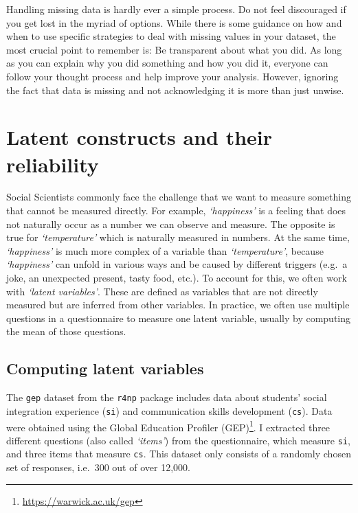 \documentclass[
  letterpaper,
]{krantz}
\renewcommand{\href}[2]{#2\footnote{\url{#1}}}
\begin{document}
Handling missing data is hardly ever a simple process. Do not feel
discouraged if you get lost in the myriad of options. While there is
some guidance on how and when to use specific strategies to deal with
missing values in your dataset, the most crucial point to remember is:
Be transparent about what you did. As long as you can explain why you
did something and how you did it, everyone can follow your thought
process and help improve your analysis. However, ignoring the fact that
data is missing and not acknowledging it is more than just unwise.

\section{Latent constructs and their
reliability}\label{sec-latent-constructs}

Social Scientists commonly face the challenge that we want to measure
something that cannot be measured directly. For example,
\emph{`happiness'} is a feeling that does not naturally occur as a
number we can observe and measure. The opposite is true for
\emph{`temperature'} which is naturally measured in numbers. At the same
time, \emph{`happiness'} is much more complex of a variable than
\emph{`temperature'}, because \emph{`happiness'} can unfold in various
ways and be caused by different triggers (e.g.~a joke, an unexpected
present, tasty food, etc.). To account for this, we often work with
\emph{`latent variables'}. These are defined as variables that are not
directly measured but are inferred from other variables. In practice, we
often use multiple questions in a questionnaire to measure one latent
variable, usually by computing the mean of those questions.

\subsection{Computing latent
variables}\label{sec-computing-latent-variables}

The \texttt{gep} dataset from the \texttt{r4np} package includes data
about students' social integration experience (\texttt{si}) and
communication skills development (\texttt{cs}). Data were obtained using
the \href{https://warwick.ac.uk/gep}{Global Education Profiler (GEP)}. I
extracted three different questions (also called \emph{`items'}) from
the questionnaire, which measure \texttt{si}, and three items that
measure \texttt{cs}. This dataset only consists of a randomly chosen set
of responses, i.e.~300 out of over 12,000.
\end{document}
